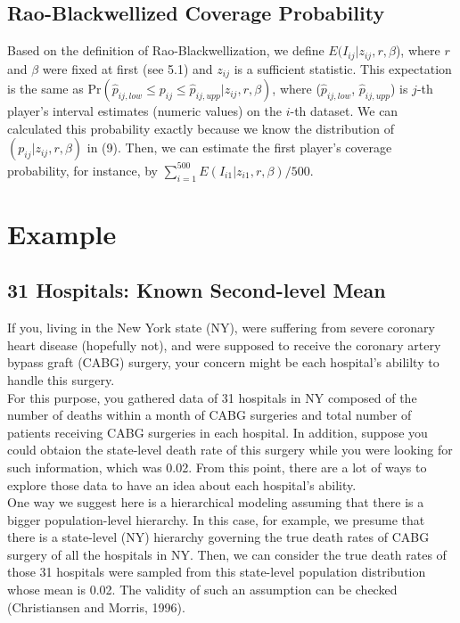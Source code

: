 \documentclass[article]{jss}
\begin{document}
\subsection{Rao-Blackwellized Coverage Probability}
Based on the definition of Rao-Blackwellization, we define $E(I_{ij}\vert z_{ij}, r, \beta$), where $r$ and $\beta$ were fixed at first (see 5.1) and $z_{ij}$ is a sufficient statistic. This expectation is the same as Pr$(\hat{p}_{ij, low}\le p_{ij} \le\hat{p}_{ij, upp}\vert z_{ij}, r, \beta)$, where ($\hat{p}_{ij, low}$, $\hat{p}_{ij, upp}$) is $j$-th player's interval estimates (numeric values) on the $i$-th dataset. We can calculated this probability exactly because we know the distribution of $(p_{ij} \vert z_{ij}, r, \beta)$ in (9). Then, we can estimate the first player's coverage probability, for instance, by $\sum_{i=1}^{500}E(I_{i1}\vert z_{i1}, r, \beta)/500$.
\section[Example]{Example}
\subsection[Known Second-level Mean]{31 Hospitals: Known Second-level Mean}
If you, living in the New York state (NY), were suffering from severe coronary heart disease (hopefully not), and were supposed to receive the coronary artery bypass graft (CABG) surgery, your concern might be each hospital's abililty to handle this surgery.
\\

For this purpose, you gathered data of 31 hospitals in NY composed of the number of deaths within a month of CABG surgeries and total number of patients receiving CABG surgeries in each hospital. In addition, suppose you could obtaion the state-level death rate of this surgery while you were looking for such information, which was 0.02. From this point, there are a lot of ways to explore those data to have an idea about each hospital's ability. 
\\

One way we suggest here is a hierarchical modeling assuming that there is a bigger population-level hierarchy. In this case, for example, we presume that there is a state-level (NY) hierarchy governing the true death rates of CABG surgery of all the hospitals in NY. Then, we can consider the true death rates of those 31 hospitals were sampled from this state-level population distribution whose mean is 0.02. The validity of such an assumption can be checked (Christiansen and Morris, 1996).
\\
\end{document}
